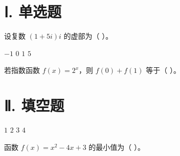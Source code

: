 \section*{Ⅰ. 单选题}\begin{question}
设复数 $(1+5i)i$ 的虚部为（ ）。

\begin{choices}
  \choice $-1$
  \choice $0$
  \choice $1$
  \choice $5$
\end{choices}

\end{question}

\begin{question}
若指数函数 $f(x)=2^x$，则 $f(0)+f(1)$ 等于（ ）。 





\section*{Ⅱ. 填空题}

\begin{choices}
  \choice $1$
  \choice $2$
  \choice $3$
  \choice $4$
\end{choices}

\end{question}

\begin{question}
函数 $f(x)=x^2-4x+3$ 的最小值为（ ）。 




\begin{fillblank}
\end{fillblank}



\end{question}

